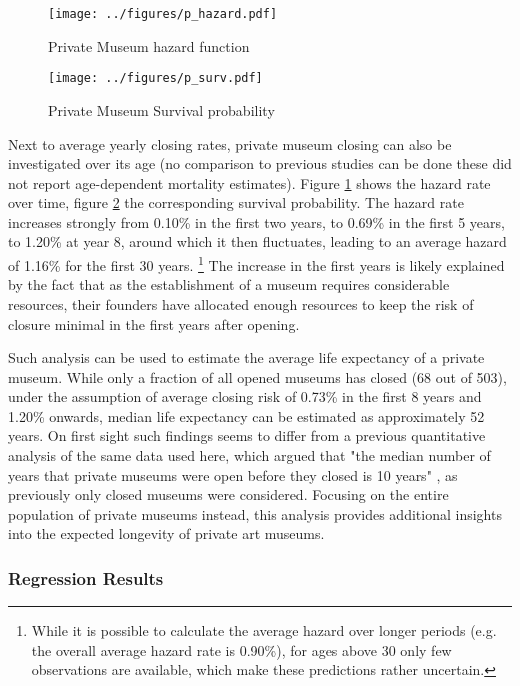 \documentclass[12pt]{article}
\begin{document}
\begin{figure}[htbp]
\centering
\texttt{[image: ../figures/p\_hazard.pdf]}
\caption{\label{fig:p_hazard}Private Museum hazard function}
\end{figure}

\begin{figure}[htbp]
\centering
\texttt{[image: ../figures/p\_surv.pdf]}
\caption{\label{fig:p_surv}Private Museum Survival probability}
\end{figure}


Next to average yearly closing rates, private museum closing can also be investigated over its age (no comparison to previous studies can be done these did not report age-dependent mortality estimates).
Figure \ref{fig:p_hazard} shows the hazard rate over time, figure \ref{fig:p_surv} the corresponding survival probability.
The hazard rate increases strongly from 0.10\% in the first two years, to 0.69\% in the first 5 years, to 1.20\% at year 8, around which it then fluctuates, leading to an average hazard of 1.16\% for the first 30 years. \footnote{While it is possible to calculate the average hazard over longer periods (e.g. the overall average hazard rate is 0.90\%), for ages above 30 only few observations are available, which make these predictions rather uncertain.}
The increase in the first years is likely explained by the fact that as the establishment of a museum requires considerable resources, their founders have allocated enough resources to keep the risk of closure minimal in the first years after opening.



Such analysis can be used to estimate the average life expectancy of a private museum.
While only a fraction of all opened museums has closed (68 out of 503), under the assumption of average closing risk of 0.73\% in the first 8 years and 1.20\% onwards, median life expectancy can be estimated as approximately 52 years.
On first sight such findings seems to differ from a previous quantitative analysis of the same data used here, which argued that "the median number of years that private museums were open before they closed is 10 years" \parencite[p.5]{Velthuis_Gera_2024_fragility}, as previously only closed museums were considered.
Focusing on the entire population of private museums instead, this analysis provides additional insights into the expected longevity of private art museums.
\subsubsection*{Regression Results}
\end{document}
